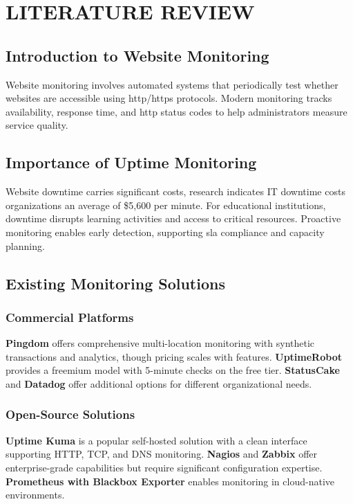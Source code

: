 \chapter{LITERATURE REVIEW}

\section{Introduction to Website Monitoring}

Website monitoring involves automated systems that periodically test whether websites are accessible using \gls{http}/\gls{https} protocols. Modern monitoring tracks availability, response time, and \gls{http} status codes to help administrators measure service quality.

\section{Importance of Uptime Monitoring}

Website downtime carries significant costs, research indicates IT downtime costs organizations an average of \$5,600 per minute. For educational institutions, downtime disrupts learning activities and access to critical resources. Proactive monitoring enables early detection, supporting \gls{sla} compliance and capacity planning.

\section{Existing Monitoring Solutions}

\subsection{Commercial Platforms}

\textbf{Pingdom} offers comprehensive multi-location monitoring with synthetic transactions and analytics, though pricing scales with features. \textbf{UptimeRobot} provides a freemium model with 5-minute checks on the free tier. \textbf{StatusCake} and \textbf{Datadog} offer additional options for different organizational needs.

\subsection{Open-Source Solutions}

\textbf{Uptime Kuma} is a popular self-hosted solution with a clean interface supporting HTTP, TCP, and DNS monitoring. \textbf{Nagios} and \textbf{Zabbix} offer enterprise-grade capabilities but require significant configuration expertise. \textbf{Prometheus with Blackbox Exporter} enables monitoring in cloud-native environments.

